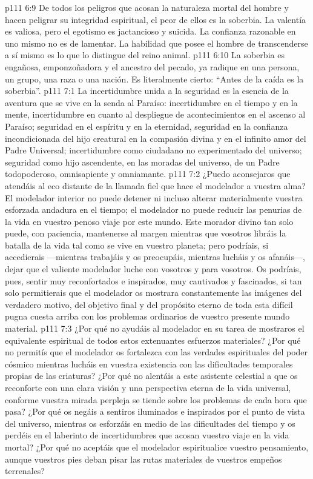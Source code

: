 \vs p111 6:9 \pc De todos los peligros que acosan la naturaleza mortal del hombre y hacen peligrar su integridad espiritual, el peor de ellos es la soberbia. La valentía es valiosa, pero el egotismo es jactancioso y suicida. La confianza razonable en uno mismo no es de lamentar. La habilidad que posee el hombre de transcenderse a sí mismo es lo que lo distingue del reino animal.
\vs p111 6:10 \pc La soberbia es engañosa, emponzoñadora y el ancestro del pecado, ya radique en una persona, un grupo, una raza o una nación. Es literalmente cierto: “Antes de la caída es la soberbia”.
\vs p111 7:1 La incertidumbre unida a la seguridad es la esencia de la aventura que se vive en la senda al Paraíso: incertidumbre en el tiempo y en la mente, incertidumbre en cuanto al despliegue de acontecimientos en el ascenso al Paraíso; seguridad en el espíritu y en la eternidad, seguridad en la confianza incondicionada del hijo creatural en la compasión divina y en el infinito amor del Padre Universal; incertidumbre como ciudadano no experimentado del universo; seguridad como hijo ascendente, en las moradas del universo, de un Padre todopoderoso, omnisapiente y omniamante.
\vs p111 7:2 \pc ¿Puedo aconsejaros que atendáis al eco distante de la llamada fiel que hace el modelador a vuestra alma? El modelador interior no puede detener ni incluso alterar materialmente vuestra esforzada andadura en el tiempo; el modelador no puede reducir las penurias de la vida en vuestro penoso viaje por este mundo. Este morador divino tan solo puede, con paciencia, mantenerse al margen mientras que vosotros libráis la batalla de la vida tal como se vive en vuestro planeta; pero podríais, si accedierais ---mientras trabajáis y os preocupáis, mientras lucháis y os afanáis---, dejar que el valiente modelador luche con vosotros y para vosotros. Os podríais, pues, sentir muy reconfortados e inspirados, muy cautivados y fascinados, si tan solo permitierais que el modelador os mostrara constantemente las imágenes del verdadero motivo, del objetivo final y del propósito eterno de toda esta difícil pugna cuesta arriba con los problemas ordinarios de vuestro presente mundo material.
\vs p111 7:3 ¿Por qué no ayudáis al modelador en su tarea de mostraros el equivalente espiritual de todos estos extenuantes esfuerzos materiales? ¿Por qué no permitís que el modelador os fortalezca con las verdades espirituales del poder cósmico mientras lucháis en vuestra existencia con las dificultades temporales propias de las criaturas? ¿Por qué no alentáis a este asistente celestial a que os reconforte con una clara visión y una perspectiva eterna de la vida universal, conforme vuestra mirada perpleja se tiende sobre los problemas de cada hora que pasa? ¿Por qué os negáis a sentiros iluminados e inspirados por el punto de vista del universo, mientras os esforzáis en medio de las dificultades del tiempo y os perdéis en el laberinto de incertidumbres que acosan vuestro viaje en la vida mortal? ¿Por qué no aceptáis que el modelador espiritualice vuestro pensamiento, aunque vuestros pies deban pisar las rutas materiales de vuestros empeños terrenales?

